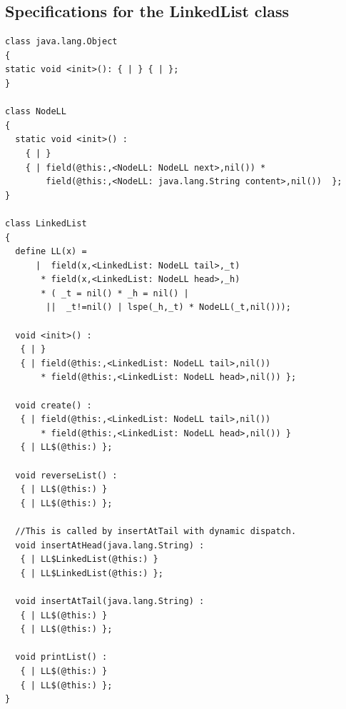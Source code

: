 \documentclass[11pt]{article}
\begin{document}
\subsection{Specifications for the LinkedList class}
\begin{verbatim}
class java.lang.Object 
{
static void <init>(): { | } { | };
}

class NodeLL
{
  static void <init>() : 
    { | } 
    { | field(@this:,<NodeLL: NodeLL next>,nil()) * 
        field(@this:,<NodeLL: java.lang.String content>,nil())  };
}

class LinkedList
{
  define LL(x) =  
      |  field(x,<LinkedList: NodeLL tail>,_t) 
       * field(x,<LinkedList: NodeLL head>,_h) 
       * ( _t = nil() * _h = nil() | 
        ||  _t!=nil() | lspe(_h,_t) * NodeLL(_t,nil())); 
       
  void <init>() : 
   { | } 
   { | field(@this:,<LinkedList: NodeLL tail>,nil()) 
       * field(@this:,<LinkedList: NodeLL head>,nil()) };

  void create() : 
   { | field(@this:,<LinkedList: NodeLL tail>,nil()) 
       * field(@this:,<LinkedList: NodeLL head>,nil()) }
   { | LL$(@this:) };

  void reverseList() : 
   { | LL$(@this:) } 
   { | LL$(@this:) };

  //This is called by insertAtTail with dynamic dispatch.
  void insertAtHead(java.lang.String) : 
   { | LL$LinkedList(@this:) } 
   { | LL$LinkedList(@this:) };

  void insertAtTail(java.lang.String) : 
   { | LL$(@this:) } 
   { | LL$(@this:) };

  void printList() : 
   { | LL$(@this:) } 
   { | LL$(@this:) };
}
\end{verbatim}
\end{document}
